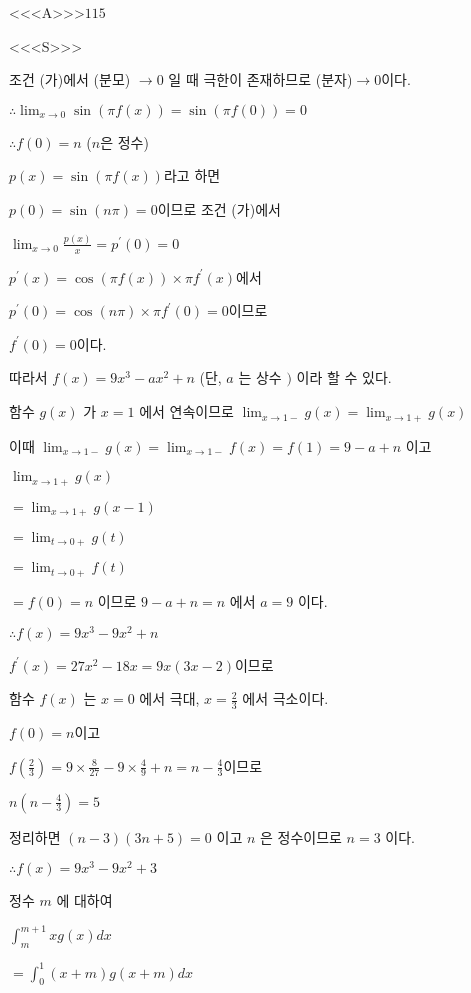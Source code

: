 \documentclass{oblivoir}
\begin{document}
<<<A>>>$115$

<<<S>>>



조건 (가)에서 (분모) $\rightarrow 0$ 일 때 극한이 존재하므로 (분자)$\rightarrow 0$이다.

$\therefore \lim _{x \rightarrow 0} \sin (\pi f(x))=\sin (\pi f(0))=0 $

$\therefore f(0)=n$ ($n$은 정수)

$p(x)=\sin (\pi f(x))$라고 하면

$p(0)=\sin (n \pi)=0$이므로 조건 (가)에서

$\lim _{x \rightarrow 0} \frac{p(x)}{x}=p^{\prime}(0)=0$

$p^{\prime}(x)=\cos (\pi f(x)) \times \pi f^{\prime}(x)$에서

$p^{\prime}(0)=\cos (n \pi) \times \pi f^{\prime}(0)=0$이므로

$f^{\prime}(0)=0$이다.

따라서 $f(x)=9 x^{3}-a x^{2}+n$ (단, $a$ 는 상수 $)$ 이라 할 수 있다.

함수 $g(x)$ 가 $x=1$ 에서 연속이므로 $\lim _{x \rightarrow 1-} g(x)=\lim _{x \rightarrow 1+} g(x)$

이때 $\lim _{x \rightarrow 1-} g(x)=\lim _{x \rightarrow 1-} f(x)=f(1)=9-a+n$ 이고

$\lim _{x \rightarrow 1+} g(x) $

$=\lim _{x \rightarrow 1+} g(x-1)$

$=\lim _{t \rightarrow 0+} g(t)$

$=\lim _{t \rightarrow 0+} f(t)$

$=f(0)=n$ 이므로 $9-a+n=n$ 에서 $a=9$ 이다.

$\therefore f(x)=9 x^{3}-9 x^{2}+n$

$f^{\prime}(x)=27 x^{2}-18 x=9 x(3 x-2)$이므로

함수 $f(x)$ 는 $x=0$ 에서 극대, $x=\frac{2}{3}$ 에서 극소이다.

$f(0)=n$이고

$f\left(\frac{2}{3}\right)=9 \times \frac{8}{27}-9 \times \frac{4}{9}+n=n-\frac{4}{3}$이므로

$n\left(n-\frac{4}{3}\right)=5$

정리하면 $(n-3)(3 n+5)=0$ 이고 $n$ 은 정수이므로 $n=3$ 이다.

$\therefore f(x)=9 x^{3}-9 x^{2}+3$

정수 $m$ 에 대하여

$\int_{m}^{m+1} x g(x) d x$

$=\int_{0}^{1}(x+m) g(x+m) d x$
\end{document}
